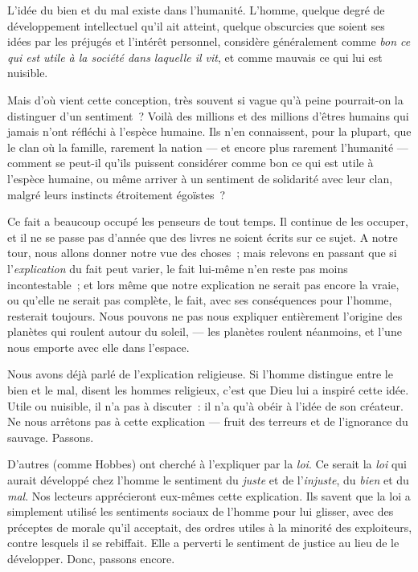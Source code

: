 \documentclass[french,twoside]{book} %
\begin{document}
\noindent L’idée du bien et du mal existe dans l’humanité. L’homme, quelque degré de développement intellectuel qu’il ait atteint, quelque obscurcies que soient ses idées par les préjugés et l’intérêt personnel, considère généralement comme \emph{bon ce qui est utile à la société dans laquelle il vit}, et comme mauvais ce qui lui est nuisible.\par
Mais d’où vient cette conception, très souvent si vague qu’à peine pourrait-on la distinguer d’un sentiment ? Voilà des millions et des millions d’êtres humains qui jamais n’ont réfléchi à l’espèce humaine. Ils n’en connaissent, pour la plupart, que le clan où la famille, rarement la nation — et encore plus rarement l’humanité — comment se peut-il qu’ils puissent considérer comme bon ce qui est utile à l’espèce humaine, ou même arriver à un sentiment de solidarité avec leur clan, malgré leurs instincts étroitement égoïstes ?\par
Ce fait a beaucoup occupé les penseurs de tout temps. Il continue de les occuper, et il ne se passe pas d’année que des livres ne soient  écrits sur ce sujet. A notre tour, nous allons donner notre vue des choses ; mais relevons en passant que si l’\emph{explication} du fait peut varier, le fait lui-même n’en reste pas moins incontestable ; et lors même que notre explication ne serait pas encore la vraie, ou qu’elle ne serait pas complète, le fait, avec ses conséquences pour l’homme, resterait toujours. Nous pouvons ne pas nous expliquer entièrement l’origine des planètes qui roulent autour du soleil, — les planètes roulent néanmoins, et l’une nous emporte avec elle dans l’espace.\par
\bigbreak
\noindent Nous avons déjà parlé de l’explication religieuse. Si l’homme distingue entre le bien et le mal, disent les hommes religieux, c’est que Dieu lui a inspiré cette idée. Utile ou nuisible, il n’a pas à discuter : il n’a qu’à obéir à l’idée de son créateur. Ne nous arrêtons pas à cette explication — fruit des terreurs et de l’ignorance du sauvage. Passons.\par
D’autres (comme Hobbes) ont cherché à l’expliquer par la \emph{loi}. Ce serait la \emph{loi} qui aurait développé chez l’homme le sentiment du \emph{juste} et de l’\emph{injuste}, du \emph{bien} et du \emph{mal}. Nos lecteurs apprécieront eux-mêmes cette explication. Ils savent que la loi a simplement utilisé les sentiments sociaux de l’homme pour lui glisser, avec des préceptes de morale qu’il acceptait, des ordres utiles à la minorité des exploiteurs, contre lesquels il se rebiffait. Elle a perverti le sentiment de justice au lieu de le développer. Donc, passons encore.\par
\end{document}
